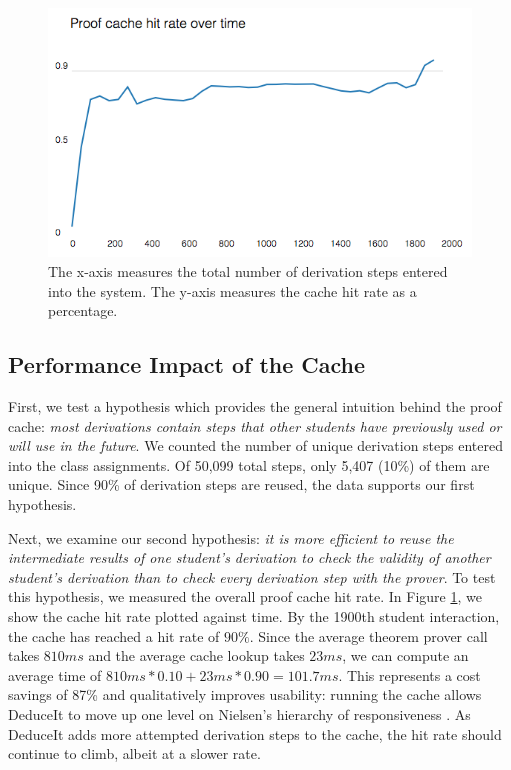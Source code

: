 \documentclass{sigchi}
\begin{document}
\begin{figure}[!h]
\centering
\includegraphics[width=1\columnwidth]{cache}
\caption{The x-axis measures the total number of derivation steps entered into the system. The y-axis measures the cache hit rate as a percentage.}
\label{fig:proofcache}
\end{figure}

\subsection{Performance Impact of the Cache}
First, we test a hypothesis which provides the general intuition behind the proof cache: \textit{most derivations contain steps that other students have previously used or will use in the future}. We counted the number of unique derivation steps entered into the class assignments. Of 50,099 total steps, only 5,407 (10\%) of them are unique. Since 90\% of derivation steps are reused, the data supports our first hypothesis.

Next, we examine our second hypothesis: \textit{it is more efficient to reuse the intermediate results of one student's derivation to check the validity of another student's derivation than to check every derivation step with the prover}. To test this hypothesis, we measured the overall proof cache hit rate. In Figure \ref{fig:proofcache}, we show the cache hit rate plotted against time. By the 1900th student interaction, the cache has reached a hit rate of $90\%$. Since the average theorem prover call takes $810ms$ and the average cache lookup takes $23ms$, we can compute an average time of $810ms*0.10+23ms*0.90=101.7ms$. This represents a cost savings of 87\% and qualitatively improves usability: running the cache allows DeduceIt to move up one level on Nielsen's hierarchy of responsiveness \cite{neilsen}. As DeduceIt adds more attempted derivation steps to the cache, the hit rate should continue to climb, albeit at a slower rate.
\end{document}
